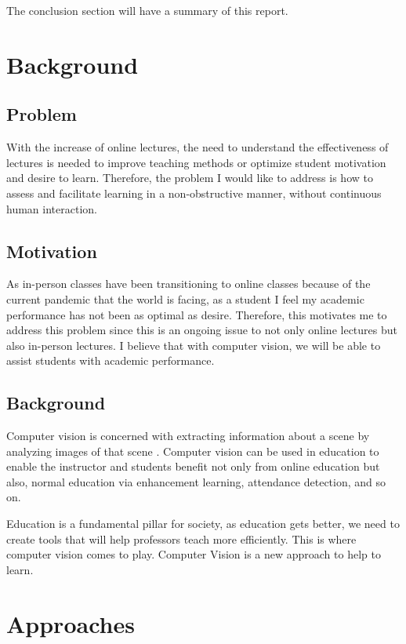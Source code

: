 \documentclass[conference]{IEEEtran}
\begin{document}
The conclusion section will have a summary of this report.

\section{Background}

\subsection{Problem}

With the increase of online lectures, the need to understand the effectiveness
of lectures is needed to improve teaching methods or optimize student motivation
and desire to learn. Therefore, the problem I would like to address
is how to assess and facilitate learning in a non-obstructive manner, without
continuous human interaction.

\subsection{Motivation}

As in-person classes have been transitioning to online classes because of the
current pandemic that the world is facing, as a student I feel my academic
performance has not been as optimal as desire. Therefore, this motivates me to
address this problem since this is an ongoing issue to not only online lectures but
also in-person lectures. I believe that with computer vision, we will be able to assist
students with academic performance.

\subsection{Background}

Computer vision is concerned with extracting information about a scene by analyzing images of that scene \cite{b9}.
Computer vision can be used in education to enable the instructor and students benefit not only from online education but also, normal education via enhancement learning, 
attendance detection, and so on.

Education is a fundamental pillar for society, as education gets better, we need to create tools that will help professors teach more efficiently. This is where computer vision comes to play.
Computer Vision is a new approach to help to learn.

\section{Approaches}
\end{document}
